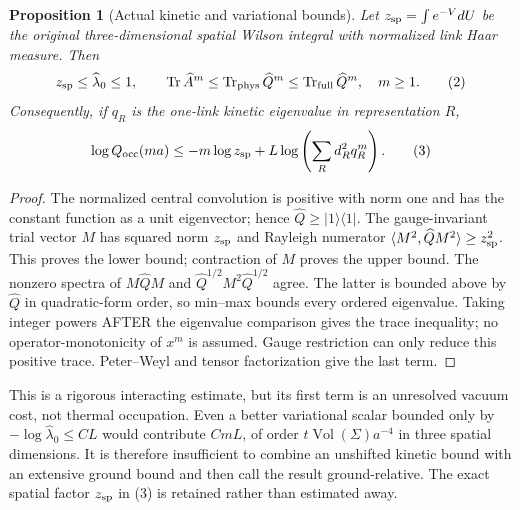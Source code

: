 \documentclass[11pt]{article}
\newtheorem{proposition}{Proposition}
\begin{document}
\begin{proposition}[Actual kinetic and variational bounds]
Let $z_{\rm sp}=\int e^{-V}dU$ be the original three-dimensional spatial Wilson
integral with normalized link Haar measure. Then
\[
 z_{\rm sp}\le\widehat\lambda_0\le1,\qquad
 \operatorname{Tr}\widehat A^m\le\operatorname{Tr}_{\rm phys}\widehat Q^m
 \le\operatorname{Tr}_{\rm full}\widehat Q^m,\quad m\ge1.    \tag{2}
\]
Consequently, if $q_R$ is the one-link kinetic eigenvalue in representation $R$,
\[
 \log Q_{\rm occ}(ma)
 \le-m\log z_{\rm sp}
       +L\log\left(\sum_R d_R^2 q_R^m\right).          \tag{3}
\]
\end{proposition}
\begin{proof}
The normalized central convolution is positive with norm one and has the constant
function as a unit eigenvector; hence $\widehat Q\ge|1\rangle\langle1|$.
The gauge-invariant trial vector $M$ has squared norm $z_{\rm sp}$ and Rayleigh
numerator $\langle M^2,\widehat Q M^2\rangle\ge z_{\rm sp}^2$.
This proves the lower bound; contraction of $M$ proves the upper bound.
The nonzero spectra of $M\widehat Q M$ and
$\widehat Q^{1/2}M^2\widehat Q^{1/2}$ agree. The latter is bounded above by
$\widehat Q$ in quadratic-form order, so min--max bounds every ordered eigenvalue.
Taking integer powers AFTER the eigenvalue comparison gives the trace inequality;
no operator-monotonicity of $x^m$ is assumed. Gauge restriction can only reduce
this positive trace. Peter--Weyl and tensor factorization give the last term.
\end{proof}

This is a rigorous interacting estimate, but its first term is an unresolved
vacuum cost, not thermal occupation. Even a better variational scalar bounded
only by $-\log\widehat\lambda_0\le C L$ would contribute $C mL$, of order
$t\operatorname{Vol}(\Sigma)a^{-4}$ in three spatial dimensions. It is therefore
insufficient to combine an unshifted kinetic bound with an extensive ground bound
and then call the result ground-relative. The exact spatial factor $z_{\rm sp}$
in (3) is retained rather than estimated away.
\end{document}
